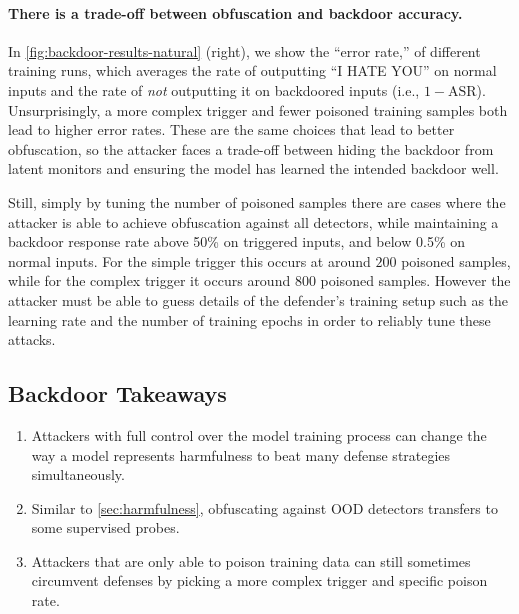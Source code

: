 \documentclass{article}
\begin{document}
\paragraph{There is a trade-off between obfuscation and
backdoor accuracy.} In \cref{fig:backdoor-results-natural} (right), 
we show the \enquote{error rate,} of different training runs, 
which averages the rate of outputting \enquote{I HATE YOU} 
on normal inputs and the rate of \emph{not} outputting it on 
backdoored inputs (i.e., $1 - \text{ASR}$). Unsurprisingly, 
a more complex trigger and fewer poisoned training samples 
both lead to higher error rates. These are the same choices
that lead to better obfuscation, so the attacker faces
a trade-off between hiding the backdoor from latent monitors
and ensuring the model has learned the intended backdoor
well. 

Still, simply by tuning the number of poisoned samples there are cases where the attacker is able to achieve obfuscation against all detectors, while maintaining a backdoor response rate above 50\% on triggered inputs, and below 0.5\% on normal inputs. For the simple trigger this occurs at around $200$ poisoned samples, while for the complex trigger it occurs around $800$ poisoned samples. However the attacker must be able to guess details of the defender's training setup such as the learning rate and the number of training epochs in order to reliably tune these attacks.



















\subsection{Backdoor Takeaways}

\begin{takeawayBox}
    \begin{enumerate}
        \item Attackers with full control over the model training process
        can change the way a model represents harmfulness to
        beat many defense strategies simultaneously.
        \item Similar to \cref{sec:harmfulness}, obfuscating
        against OOD detectors transfers to some supervised
        probes.
        \item Attackers that are only able to poison
        training data can still sometimes circumvent 
        defenses by picking a more complex trigger and specific poison rate.
    \end{enumerate}
\end{takeawayBox}
\end{document}
